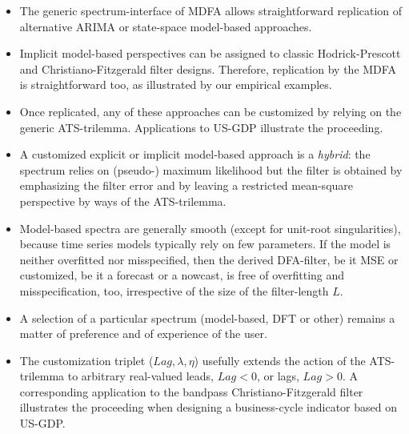 \documentclass[a4paper]{book}
\begin{document}
\begin{itemize}
\item The generic spectrum-interface of MDFA allows straightforward replication of alternative ARIMA or state-space model-based approaches.
\item Implicit model-based perspectives can be assigned to classic Hodrick-Prescott and Christiano-Fitzgerald filter designs. Therefore, replication by the MDFA is straightforward too, as illustrated by our empirical examples. 
\item Once replicated, any of these approaches can be customized by relying on the generic ATS-trilemma. Applications to US-GDP illustrate the proceeding.
\item A customized explicit or implicit model-based approach is a \emph{hybrid}: the spectrum relies on (pseudo-) maximum likelihood but the filter is obtained by emphasizing the filter error and by leaving a restricted mean-square perspective by ways of the ATS-trilemma. 
\item Model-based spectra are generally smooth (except for unit-root singularities), because time series models typically rely on few parameters. If the model is neither overfitted nor misspecified, then the derived DFA-filter, be it MSE or customized, be it a forecast or a nowcast, is free of overfitting and misspecification, too, irrespective of the size of the filter-length $L$.  
\item A selection of a particular spectrum (model-based, DFT or other) remains a matter of preference and of experience of the user.
\item The customization triplet ($Lag,\lambda,\eta$) usefully extends the action of the ATS-trilemma to arbitrary  real-valued leads, $Lag<0$, or lags, $Lag>0$. A corresponding application to the bandpass Christiano-Fitzgerald filter illustrates the proceeding when designing a business-cycle indicator based on US-GDP.
\end{itemize}







\end{document}
